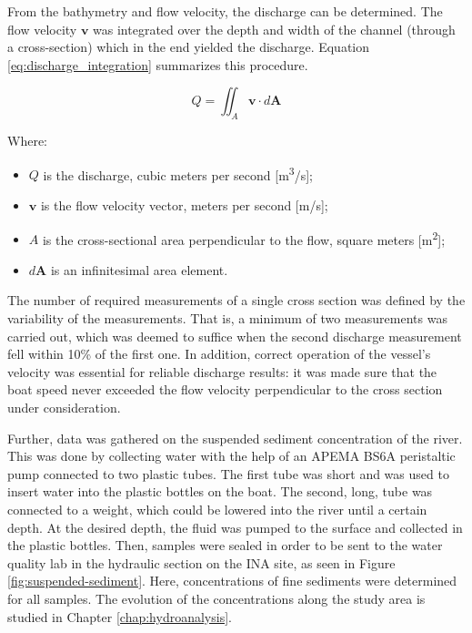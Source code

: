 From the bathymetry and flow velocity, the discharge can be determined. The flow velocity \(\mathbf{v}\) was integrated over the depth and width of the channel (through a cross-section) which in the end yielded the discharge. Equation \ref{eq:discharge_integration} summarizes this procedure.

\begin{equation}
    Q = \iint_A \mathbf{v} \cdot d\mathbf{A}
    \label{eq:discharge_integration}
\end{equation}

\noindent Where:
\begin{itemize}
    \item \(Q\) is the discharge, cubic meters per second [m\textsuperscript{3}/s];
    \item \(\mathbf{v}\) is the flow velocity vector, meters per second [m/s];
    \item \(A\) is the cross-sectional area perpendicular to the flow, square meters [m\textsuperscript{2}];
    \item \(d\mathbf{A}\) is an infinitesimal area element.
\end{itemize}

The number of required measurements of a single cross section was defined by the variability of the measurements. That is, a minimum of two measurements was carried out, which was deemed to suffice when the second discharge measurement fell within 10\% of the first one. In addition, correct operation of the vessel's velocity was essential for reliable discharge results: it was made sure that the boat speed never exceeded the flow velocity perpendicular to the cross section under consideration. 


Further, data was gathered on the suspended sediment concentration of the river. This was done by collecting water with the help of an APEMA BS6A peristaltic pump connected to two plastic tubes. The first tube was short and was used to insert water into the plastic bottles on the boat. The second, long, tube was connected to a weight, which could be lowered into the river until a certain depth. At the desired depth, the fluid was pumped to the surface and collected in the plastic bottles. Then, samples were sealed in order to be sent to the water quality lab in the hydraulic section on the INA site, as seen in Figure \ref{fig:suspended-sediment}. Here, concentrations of fine sediments were determined for all samples. The evolution of the concentrations along the study area is studied in Chapter \ref{chap:hydroanalysis}.


